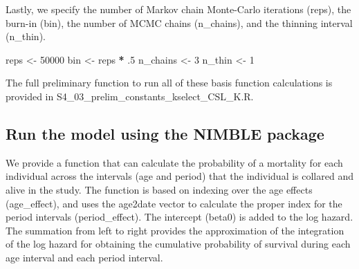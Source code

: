 \documentclass[11pt,]{article}
\newenvironment{Shaded}{\begin{snugshade}}{\end{snugshade}}
\newcommand{\DecValTok}[1]{\textcolor[rgb]{0.00,0.00,0.81}{#1}}
\newcommand{\StringTok}[1]{\textcolor[rgb]{0.31,0.60,0.02}{#1}}
\newcommand{\OperatorTok}[1]{\textcolor[rgb]{0.81,0.36,0.00}{\textbf{#1}}}
\newcommand{\NormalTok}[1]{#1}
\begin{document}
Lastly, we specify the number of Markov chain Monte-Carlo iterations
(reps), the burn-in (bin), the number of MCMC chains (n\_chains), and
the thinning interval (n\_thin).

\begin{Shaded}
\begin{Highlighting}[]
\NormalTok{reps <-}\StringTok{ }\DecValTok{50000}
\NormalTok{bin <-}\StringTok{ }\NormalTok{reps }\OperatorTok{*}\StringTok{ }\NormalTok{.}\DecValTok{5}
\NormalTok{n_chains <-}\StringTok{ }\DecValTok{3}
\NormalTok{n_thin <-}\StringTok{ }\DecValTok{1}
\end{Highlighting}
\end{Shaded}

The full preliminary function to run all of these basis function
calculations is provided in
S4\_03\_prelim\_constants\_kselect\_CSL\_K.R.

\subsection{Run the model using the NIMBLE
package}\label{run-the-model-using-the-nimble-package}

We provide a function that can calculate the probability of a mortality
for each individual across the intervals (age and period) that the
individual is collared and alive in the study. The function is based on
indexing over the age effects (age\_effect), and uses the age2date
vector to calculate the proper index for the period intervals
(period\_effect). The intercept (beta0) is added to the log hazard. The
summation from left to right provides the approximation of the
integration of the log hazard for obtaining the cumulative probability
of survival during each age interval and each period interval.
\end{document}
